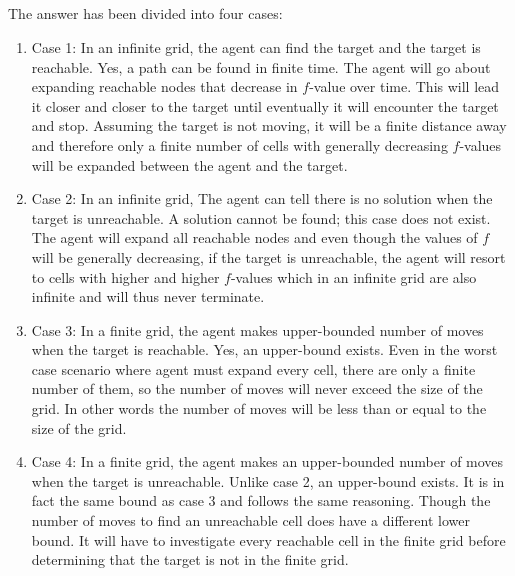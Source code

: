 \documentclass[a4paper,12pt]{article}
\begin{document}
\subsection{}
The answer has been divided into four cases:
\begin{enumerate}
	\item Case 1: In an infinite grid, the agent can find the target and the target is reachable. Yes, a path can be found in finite time. 
		\newline The agent will go about expanding reachable nodes that decrease in $f$-value over time. This will lead it closer and closer to the target until eventually it will encounter the target and stop. Assuming the target is not moving, it will be a finite distance away and therefore only a finite number of cells with generally decreasing $f$-values will be expanded between the agent and the target. 		
		
	\item Case 2: In an infinite grid, The agent can tell there is no solution when the target is unreachable. A solution cannot be found; this case does not exist.
		\newline The agent will expand all reachable nodes and even though the values of $f$ will be generally decreasing, if the target is unreachable, the agent will resort to cells with higher and higher $f$-values which in an infinite grid are also infinite and will thus never terminate. 
		
	\item Case 3: In a finite grid, the agent makes upper-bounded number of moves when the target is reachable. Yes, an upper-bound exists.
		\newline Even in the worst case scenario where agent must expand every cell, there are only a finite number of them, so the number of moves will never exceed the size of the grid. In other words the number of moves will be less than or equal to the size of the grid. 
		
	\item Case 4: In a finite grid, the agent makes an upper-bounded number of moves when the target is unreachable. Unlike case 2, an upper-bound exists. 
		\newline It is in fact the same bound as case 3 and follows the same reasoning. Though the number of moves to find an unreachable cell does have a different lower bound. It will have to investigate every reachable cell in the finite grid before determining that the target is not in the finite grid. 
		
\end{enumerate}
\end{document}
